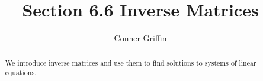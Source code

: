 \documentclass{ximera}
\title{Section 6.6 Inverse Matrices}
\author{Conner Griffin}
\begin{document}
\begin{abstract}
    We introduce inverse matrices and use them to find solutions to systems of linear equations.
\end{abstract}
\maketitle




\end{document}
